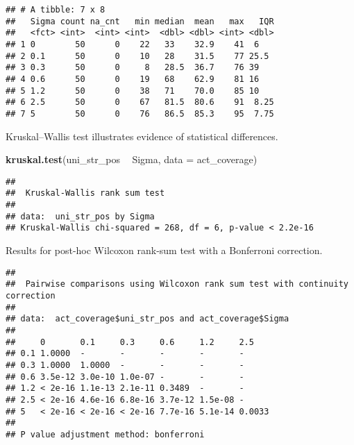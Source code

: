 \documentclass[]{book}
\newenvironment{Shaded}{\begin{snugshade}}{\end{snugshade}}
\newcommand{\DataTypeTok}[1]{\textcolor[rgb]{0.13,0.29,0.53}{#1}}
\newcommand{\KeywordTok}[1]{\textcolor[rgb]{0.13,0.29,0.53}{\textbf{#1}}}
\newcommand{\NormalTok}[1]{#1}
\newcommand{\OperatorTok}[1]{\textcolor[rgb]{0.81,0.36,0.00}{\textbf{#1}}}
\newcommand{\OtherTok}[1]{\textcolor[rgb]{0.56,0.35,0.01}{#1}}
\newcommand{\StringTok}[1]{\textcolor[rgb]{0.31,0.60,0.02}{#1}}
\begin{document}
\begin{verbatim}
## # A tibble: 7 x 8
##   Sigma count na_cnt   min median  mean   max   IQR
##   <fct> <int>  <int> <int>  <dbl> <dbl> <int> <dbl>
## 1 0        50      0    22   33    32.9    41  6   
## 2 0.1      50      0    10   28    31.5    77 25.5 
## 3 0.3      50      0     8   28.5  36.7    76 39   
## 4 0.6      50      0    19   68    62.9    81 16   
## 5 1.2      50      0    38   71    70.0    85 10   
## 6 2.5      50      0    67   81.5  80.6    91  8.25
## 7 5        50      0    76   86.5  85.3    95  7.75
\end{verbatim}

Kruskal--Wallis test illustrates evidence of statistical differences.

\begin{Shaded}
\begin{Highlighting}[]
\KeywordTok{kruskal.test}\NormalTok{(uni_str_pos }\OperatorTok{~}\StringTok{ }\NormalTok{Sigma, }\DataTypeTok{data =}\NormalTok{ act_coverage)}
\end{Highlighting}
\end{Shaded}

\begin{verbatim}
## 
##  Kruskal-Wallis rank sum test
## 
## data:  uni_str_pos by Sigma
## Kruskal-Wallis chi-squared = 268, df = 6, p-value < 2.2e-16
\end{verbatim}

Results for post-hoc Wilcoxon rank-sum test with a Bonferroni correction.

\begin{Shaded}
\end{Shaded}

\begin{verbatim}
## 
##  Pairwise comparisons using Wilcoxon rank sum test with continuity correction 
## 
## data:  act_coverage$uni_str_pos and act_coverage$Sigma 
## 
##     0       0.1     0.3     0.6     1.2     2.5   
## 0.1 1.0000  -       -       -       -       -     
## 0.3 1.0000  1.0000  -       -       -       -     
## 0.6 3.5e-12 3.0e-10 1.0e-07 -       -       -     
## 1.2 < 2e-16 1.1e-13 2.1e-11 0.3489  -       -     
## 2.5 < 2e-16 4.6e-16 6.8e-16 3.7e-12 1.5e-08 -     
## 5   < 2e-16 < 2e-16 < 2e-16 7.7e-16 5.1e-14 0.0033
## 
## P value adjustment method: bonferroni
\end{verbatim}
\end{document}
